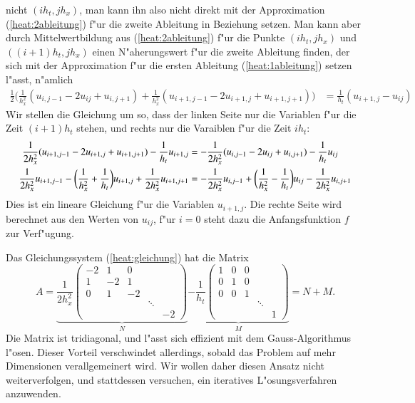 nicht $(ih_t,jh_x)$, man kann ihn also nicht direkt mit der
Approximation (\ref{heat:2ableitung}) f"ur die zweite Ableitung
in Beziehung setzen.
Man kann aber durch Mittelwertbildung aus (\ref{heat:2ableitung}) f"ur
die Punkte $(ih_t, jh_x)$ und $((i+1)h_t, jh_x)$ einen N"aherungswert
f"ur die zweite Ableitung finden, der sich mit der Approximation
f"ur die ersten Ableitung (\ref{heat:1ableitung}) setzen l"asst,
n"amlich
\begin{align}
\frac12\biggl(
\frac1{h_x^2}(u_{i,j-1}-2u_{ij}+u_{i,j+1})
+
\frac1{h_x^2}(u_{i+1,j-1}-2u_{i+1,j}+u_{i+1,j+1})
\biggr)
&=
\frac1{h_t}(u_{i+1,j}-u_{ij})
\label{heat:diskret}
\end{align}
Wir stellen die Gleichung um so, dass der linken Seite nur die 
Variablen f"ur die Zeit $(i+1)h_t$ stehen, und rechts nur die
Varaiblen f"ur die Zeit $ih_t$:
\begin{align}
\frac1{2h_x^2}(u_{i+1,j-1}-2u_{i+1,j}+u_{i+1,j+1})-\frac1{h_t}u_{i+1,j}
&=
-\frac1{2h_x^2}(u_{i,j-1}-2u_{ij}+u_{i,j+1})-\frac1{h_t}u_{ij}
\notag
\\
\frac1{2h_x^2}u_{i+1,j-1}
-\biggl(\frac1{h_x^2}+\frac1{h_t}\biggr)u_{i+1,j}
+\frac1{2h_x^2} u_{i+1,j+1}
&=
-\frac1{2h_x^2}u_{i,j-1}
+\biggl(\frac1{h_x^2}-\frac1{h_t}\biggr)u_{ij}
-\frac1{2h_x^2} u_{i,j+1}
\label{heat:gleichung}
\end{align}
Dies ist ein lineare Gleichung f"ur die Variablen $u_{i+1,j}$.
Die rechte Seite wird berechnet aus den Werten von $u_{ij}$,
f"ur $i=0$ steht dazu die Anfangsfunktion $f$ zur Verf"ugung.

Das Gleichungssystem (\ref{heat:gleichung}) hat die Matrix
\begin{equation}
A=
\underbrace{
\frac1{2h_x^2}
\begin{pmatrix}
-2& 1& 0&      &  \\
 1&-2& 1&      &  \\
 0& 1&-2&      &  \\
  &  &  &\ddots&  \\
  &  &  &      &-2
\end{pmatrix}}_N
\underbrace{
-\frac1{h_t}
\begin{pmatrix}
 1& 0& 0&      &  \\
 0& 1& 0&      &  \\
 0& 0& 1&      &  \\
  &  &  &\ddots&  \\
  &  &  &      & 1
\end{pmatrix}}_M
=N + M.
\label{heat:zerlegung}
\end{equation}
Die Matrix ist tridiagonal, und l"asst sich effizient mit dem
Gauss-Algorithmus l"osen.
Dieser Vorteil verschwindet allerdings, sobald das Problem auf
mehr Dimensionen verallgemeinert wird.
Wir wollen daher diesen Ansatz nicht weiterverfolgen, und stattdessen
versuchen, ein iteratives L"osungsverfahren anzuwenden.

